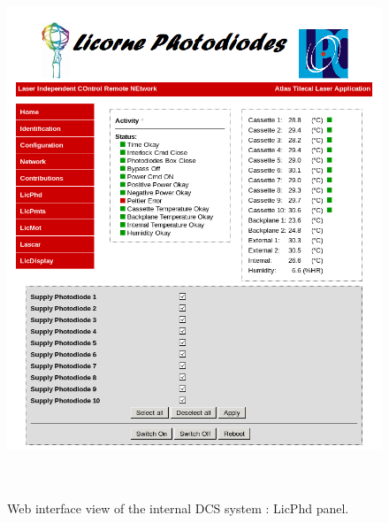 \begin{appendices}
\newpage


\begin{figure}[htbp]
\centering
\includegraphics[height=16cm]{figures/licorne_web1.png}
\caption{Web interface view of the internal DCS system : LicPhd panel.}\label{fig:licorne_weba}
\end{figure}


\end{appendices}
